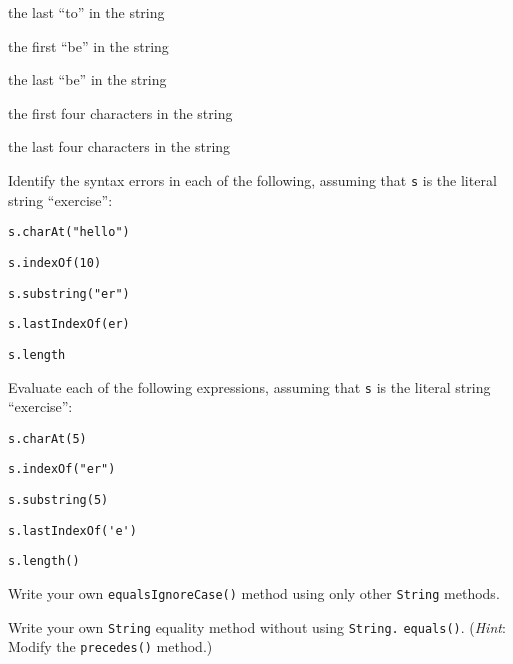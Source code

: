 \begin{EXRtwo}
\begin{EXRtwoLL}
\begin{multicols}{2}
\item  the last ``to'' in the string
\item  the first ``be'' in the string
\item  the last ``be'' in the string
\item  the first four characters in the string
\item  the last four characters in the string
\end{multicols}
\end{EXRtwoLL}


\begin{minipage}{27pc}
\item Identify the syntax errors in each of the following, assuming
that {\tt s} is the literal string ``exercise'':

\begin{EXRtwoLL}
\begin{multicols}{2}
\item  \verb|s.charAt("hello")|
\item  \verb|s.indexOf(10)|
\item  \verb|s.substring("er")|
\item  \verb|s.lastIndexOf(er)|
\item  \verb|s.length|
\end{multicols}

\end{EXRtwoLL}
\end{minipage}

\item  Evaluate each of the following expressions, assuming that
{\tt s} is the literal string ``exercise'':

\begin{EXRtwoLL}
\begin{multicols}{2}
\item  \verb|s.charAt(5)|
\item  \verb|s.indexOf("er")|
\item  \verb|s.substring(5)|
\item  \verb|s.lastIndexOf('e')|
\item  \verb|s.length()|
\end{multicols}
\end{EXRtwoLL}

\item  Write your own {\tt equalsIgnoreCase()} method using
only other {\tt String} methods.

\item  Write your own {\tt String} equality method without
using {\tt String.} \mbox{\tt equals()}. ({\it Hint}: Modify the {\tt precedes()}
method.)


\end{EXRtwo}

